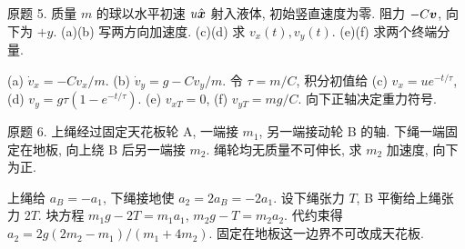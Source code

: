 \begin{exercise}
原题 5. 质量 $m$ 的球以水平初速 $u\hat{\boldsymbol{x}}$ 射入液体, 初始竖直速度为零. 阻力 $-C\boldsymbol{v}$, 向下为 $+y$. (a)(b) 写两方向加速度. (c)(d) 求 $v_x(t),v_y(t)$. (e)(f) 求两个终端分量.
\end{exercise}
\begin{solution}
(a) $\dot v_x=-Cv_x/m$. (b) $\dot v_y=g-Cv_y/m$. 令 $\tau=m/C$, 积分初值给 (c) $v_x=ue^{-t/\tau}$, (d) $v_y=g\tau(1-e^{-t/\tau})$. (e) $v_{xT}=0$, (f) $v_{yT}=mg/C$. 向下正轴决定重力符号.
\end{solution}
\begin{exercise}
原题 6. 上绳经过固定天花板轮 A, 一端接 $m_1$, 另一端接动轮 B 的轴. 下绳一端固定在地板, 向上绕 B 后另一端接 $m_2$. 绳轮均无质量不可伸长, 求 $m_2$ 加速度, 向下为正.
\end{exercise}
\begin{solution}
上绳给 $a_B=-a_1$, 下绳接地使 $a_2=2a_B=-2a_1$. 设下绳张力 $T$, B 平衡给上绳张力 $2T$. 块方程 $m_1g-2T=m_1a_1$, $m_2g-T=m_2a_2$. 代约束得 $a_2=2g(2m_2-m_1)/(m_1+4m_2)$. 固定在地板这一边界不可改成天花板.
\end{solution}
